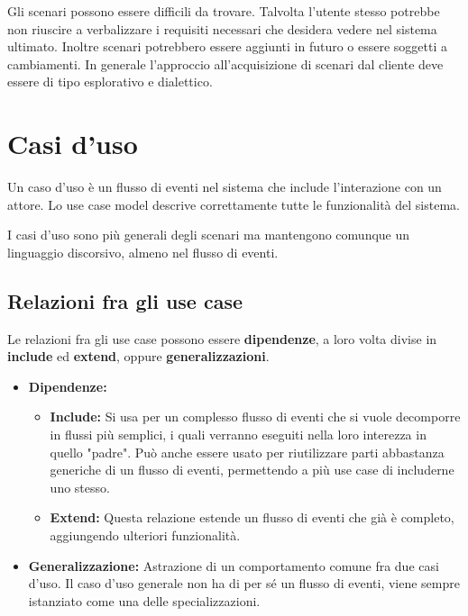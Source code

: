     Gli scenari possono essere difficili da trovare. Talvolta l'utente stesso potrebbe non riuscire a verbalizzare i requisiti necessari che desidera vedere nel sistema ultimato. Inoltre scenari potrebbero essere aggiunti in futuro o essere soggetti a cambiamenti. In generale l'approccio all'acquisizione di scenari dal cliente deve essere di tipo esplorativo e dialettico.
    
\section{Casi d'uso}
    Un caso d'uso è un flusso di eventi nel sistema che include l'interazione con un attore. Lo use case model descrive correttamente tutte le funzionalità del sistema.
    
    I casi d'uso sono più generali degli scenari ma mantengono comunque un linguaggio discorsivo, almeno nel flusso di eventi.
    
    \subsection{Relazioni fra gli use case}
        Le relazioni fra gli use case possono essere \textbf{dipendenze}, a loro volta divise in \textbf{include} ed \textbf{extend}, oppure \textbf{generalizzazioni}.
        
        \begin{itemize}
            \item \textbf{Dipendenze:}
            \begin{itemize}
                \item \textbf{Include:} Si usa per un complesso flusso di eventi che si vuole decomporre in flussi più semplici, i quali verranno eseguiti nella loro interezza in quello "padre". Può anche essere usato per riutilizzare parti abbastanza generiche di un flusso di eventi, permettendo a più use case di includerne uno stesso.
                \item \textbf{Extend:} Questa relazione estende un flusso di eventi che già è completo, aggiungendo ulteriori funzionalità.
        \end{itemize}
            \item \textbf{Generalizzazione:} Astrazione di un comportamento comune fra due casi d'uso. Il caso d'uso generale non ha di per sé un flusso di eventi, viene sempre istanziato come una delle specializzazioni.
        \end{itemize}
        
